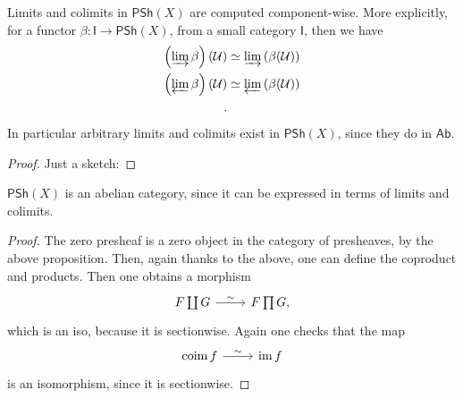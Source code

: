 \documentclass[../Main]{subfiles}
\begin{document}
\begin{prop}[]
	Limits and colimits in $\mathsf{PSh}\left( X \right)$ are computed
	component-wise.
	More explicitly, for a functor $\beta\colon \mathsf{I} \to \mathsf{PSh}\left( X \right)$,
	from a small category $\mathsf{I}$, then we have
	\begin{align}
		\left( \varinjlim \beta \right) \left( \mathcal{U} \right) &\simeq
		\varinjlim \left( \beta(\mathcal{U}) \right)\\
		\left( \varprojlim \beta \right) \left( \mathcal{U} \right) &\simeq
		\varprojlim \left( \beta(\mathcal{U}) \right)\\
	.\end{align} 
	In particular arbitrary limits and colimits exist in $\mathsf{PSh}\left( X \right)$,
	since they do in $\mathsf{Ab}$.
\end{prop}
\begin{proof}
	Just a sketch:
\end{proof}
\begin{cor}
	$\mathsf{PSh}\left( X \right)$ is an abelian category, since it can be expressed
	in terms of limits and colimits.
\end{cor} 
\begin{proof}
	The zero presheaf is a zero object in the category of presheaves, by the above proposition.
	Then, again thanks to the above, one can define the coproduct and products.
	Then one obtains a morphism
	\begin{equation}
	\begin{tikzcd}
		F \coprod G \arrow[r, "\sim", rightarrow] &
		F \prod G,
	\end{tikzcd}
	\end{equation} 
	which is an iso, because it is sectionwise.
	Again one checks that the map
	\begin{equation}
	\begin{tikzcd}
		\mathrm{coim}\, f \arrow[r, "\sim", rightarrow] &
		\ima f
	\end{tikzcd}
	\end{equation} 
	is an isomorphism, since it is sectionwise.
\end{proof}
\end{document}

